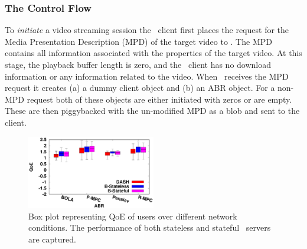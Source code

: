 \subsubsection{The Control Flow}
To \textit{initiate} a video streaming session the \bel\ client first places the request for the Media Presentation Description (MPD) of the target video to \servname. The MPD contains all information associated with the properties of the target video. At this stage, the playback buffer length is zero, and the \bel\ client has no download information or any information related to the video. When \servname\ receives the MPD request it creates (a) a dummy client object and (b) an \ac{ABR} object. For a non-MPD request both of these objects are either initiated with zeros or are empty. These are then piggybacked with the un-modified MPD as a blob and sent to the client.\\
\begin{figure}[h]
    \centering
    \includegraphics[width=0.5\textwidth]{images/qoeBox.eps}
    \caption{Box plot representing \acs{QoE} of users over different network conditions. The performance of both stateless and stateful \servname\ servers are captured.}
    \label{fig:chap05:result_qoe}
\end{figure}
